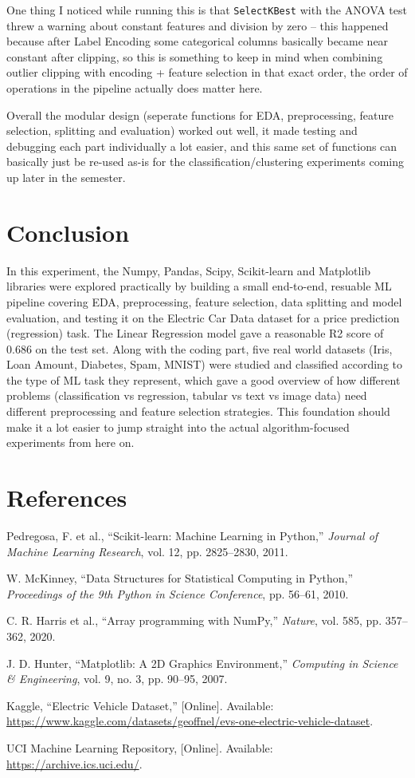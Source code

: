 \documentclass[12pt,a4paper]{article}
\begin{document}
One thing I noticed while running this is that \texttt{SelectKBest} with the ANOVA test threw a warning about constant features and division by zero -- this happened because after Label Encoding some categorical columns basically became near constant after clipping, so this is something to keep in mind when combining outlier clipping with encoding + feature selection in that exact order, the order of operations in the pipeline actually does matter here.

Overall the modular design (seperate functions for EDA, preprocessing, feature selection, splitting and evaluation) worked out well, it made testing and debugging each part individually a lot easier, and this same set of functions can basically just be re-used as-is for the classification/clustering experiments coming up later in the semester.

\section{Conclusion}
In this experiment, the Numpy, Pandas, Scipy, Scikit-learn and Matplotlib libraries were explored practically by building a small end-to-end, resuable ML pipeline covering EDA, preprocessing, feature selection, data splitting and model evaluation, and testing it on the Electric Car Data dataset for a price prediction (regression) task. The Linear Regression model gave a reasonable R2 score of 0.686 on the test set. Along with the coding part, five real world datasets (Iris, Loan Amount, Diabetes, Spam, MNIST) were studied and classified according to the type of ML task they represent, which gave a good overview of how different problems (classification vs regression, tabular vs text vs image data) need different preprocessing and feature selection strategies. This foundation should make it a lot easier to jump straight into the actual algorithm-focused experiments from here on.

\section{References}
\begin{enumerate}[label={[\arabic*]}]
\item Pedregosa, F. et al., ``Scikit-learn: Machine Learning in Python,'' \textit{Journal of Machine Learning Research}, vol. 12, pp. 2825--2830, 2011.
\item W. McKinney, ``Data Structures for Statistical Computing in Python,'' \textit{Proceedings of the 9th Python in Science Conference}, pp. 56--61, 2010.
\item C. R. Harris et al., ``Array programming with NumPy,'' \textit{Nature}, vol. 585, pp. 357--362, 2020.
\item J. D. Hunter, ``Matplotlib: A 2D Graphics Environment,'' \textit{Computing in Science \& Engineering}, vol. 9, no. 3, pp. 90--95, 2007.
\item Kaggle, ``Electric Vehicle Dataset,'' [Online]. Available: \url{https://www.kaggle.com/datasets/geoffnel/evs-one-electric-vehicle-dataset}.
\item UCI Machine Learning Repository, [Online]. Available: \url{https://archive.ics.uci.edu/}.
\end{enumerate}
\end{document}
